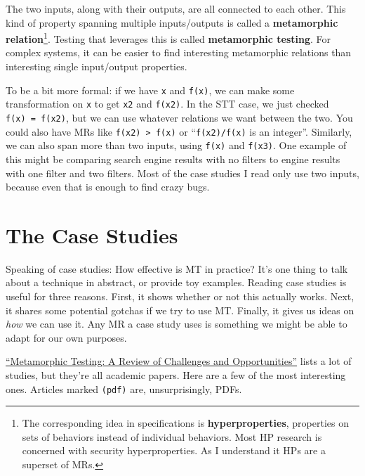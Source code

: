 The two inputs, along with their outputs, are all connected to each
other. This kind of property spanning multiple inputs/outputs is called
a \textbf{metamorphic
relation}\footnote{The corresponding idea in
  specifications is \textbf{hyperproperties}, properties on sets of
  behaviors instead of individual behaviors. Most HP research is
  concerned with security hyperproperties. As I understand it HPs are a
  superset of MRs.}.
Testing that leverages this is called \textbf{metamorphic testing}. For
complex systems, it can be easier to find interesting metamorphic
relations than interesting single input/output properties.

To be a bit more formal: if we have \texttt{x} and \texttt{f(x)}, we can
make some transformation on \texttt{x} to get \texttt{x2} and
\texttt{f(x2)}. In the STT case, we just checked
\texttt{f(x)\ =\ f(x2)}, but we can use whatever relations we want
between the two. You could also have MRs like
\texttt{f(x2)\ \textgreater{}\ f(x)} or ``\texttt{f(x2)/f(x)} is an
integer''. Similarly, we can also span more than two inputs, using
\texttt{f(x)} and \texttt{f(x3)}. One example of this might be comparing
search engine results with no filters to engine results with one filter
and two filters. Most of the case studies I read only use two inputs,
because even that is enough to find crazy bugs.

\section{The Case Studies}
\label{the-case-studies}

Speaking of case studies: How effective is MT in practice? It's one
thing to talk about a technique in abstract, or provide toy examples.
Reading case studies is useful for three reasons. First, it shows
whether or not this actually works. Next, it shares some potential
gotchas if we try to use MT. Finally, it gives us ideas on \emph{how} we
can use it. Any MR a case study uses is something we might be able to
adapt for our own purposes.

\href{http://www.cs.hku.hk/research/techreps/document/TR-2017-04.pdf}{``Metamorphic
Testing: A Review of Challenges and Opportunities''} lists a lot of
studies, but they're all academic papers. Here are a few of the most
interesting ones. Articles marked \texttt{(pdf)} are, unsurprisingly,
PDFs.

